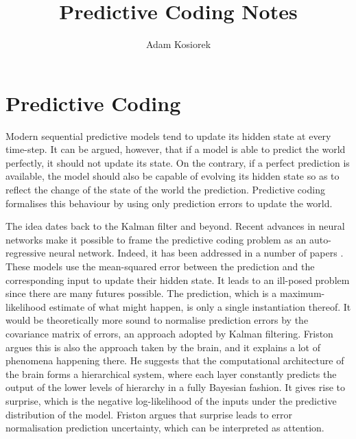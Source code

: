 \documentclass[]{article}
\title{Predictive Coding Notes}
\author{Adam Kosiorek}
\begin{document}
\maketitle

%

%	
%	
%	
\section{Predictive Coding}

	Modern sequential predictive models tend to update its hidden state at every time-step. It can be argued, however, that if a model is able to predict the world perfectly, it should not update its state. On the contrary, if a perfect prediction is available, the model should also be capable of evolving its hidden state so as to reflect the change of the state of the world \wrt the prediction. Predictive coding formalises this behaviour by using only prediction errors to update the world. 
	
	The idea dates back to the Kalman filter and beyond\addref. Recent advances in neural networks make it possible to frame the predictive coding problem as an auto-regressive neural network. Indeed, it has been addressed in a number of papers . These models use the mean-squared error between the prediction and the corresponding input to update their hidden state. It leads to an ill-posed problem since there are many futures possible. The prediction, which is a maximum-likelihood estimate of what might happen, is only a single instantiation thereof. It would be theoretically more sound to normalise prediction errors by the covariance matrix of errors, an approach adopted by Kalman filtering. Friston  argues this is also the approach taken by the brain, and it explains a lot of phenomena happening there. He suggests that the computational architecture of the brain forms a hierarchical system, where each layer constantly predicts the output of the lower levels of hierarchy in a fully Bayesian fashion. It gives rise to surprise, which is the negative log-likelihood of the inputs under the predictive distribution of the model. Friston argues that surprise leads to error normalisation \wrt prediction uncertainty, which can be interpreted as attention.
\end{document}

